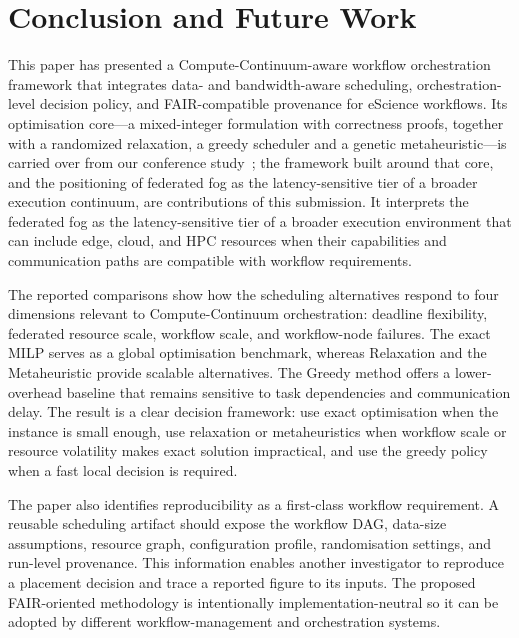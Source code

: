 \section{Conclusion and Future Work}
\label{sec:conclusion}

This paper has presented a Compute-Continuum-aware workflow orchestration framework that integrates data- and bandwidth-aware scheduling, orchestration-level decision policy, and FAIR-compatible provenance for eScience workflows. Its optimisation core---a mixed-integer formulation with correctness proofs, together with a randomized relaxation, a greedy scheduler and a genetic metaheuristic---is carried over from our conference study~\cite{gupta2025efficient}; the framework built around that core, and the positioning of federated fog as the latency-sensitive tier of a broader execution continuum, are contributions of this submission. It interprets the federated fog as the latency-sensitive tier of a broader execution environment that can include edge, cloud, and HPC resources when their capabilities and communication paths are compatible with workflow requirements.

The reported comparisons show how the scheduling alternatives respond to four dimensions relevant to Compute-Continuum orchestration: deadline flexibility, federated resource scale, workflow scale, and workflow-node failures. The exact MILP serves as a global optimisation benchmark, whereas Relaxation and the Metaheuristic provide scalable alternatives. The Greedy method offers a lower-overhead baseline that remains sensitive to task dependencies and communication delay. The result is a clear decision framework: use exact optimisation when the instance is small enough, use relaxation or metaheuristics when workflow scale or resource volatility makes exact solution impractical, and use the greedy policy when a fast local decision is required.

The paper also identifies reproducibility as a first-class workflow requirement. A reusable scheduling artifact should expose the workflow DAG, data-size assumptions, resource graph, configuration profile, randomisation settings, and run-level provenance. This information enables another investigator to reproduce a placement decision and trace a reported figure to its inputs. The proposed FAIR-oriented methodology is intentionally implementation-neutral so it can be adopted by different workflow-management and orchestration systems.

